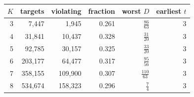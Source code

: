 \begin{table}[htbp]
\medskip

\begin{tabular}{@{}rrrrrr@{}}
\toprule
$K$ & targets & violating & fraction & worst $D$ & earliest $t$ \\
\midrule
3 & 7,447 & 1,945 & 0.261 & $\frac{86}{63}$ & 3 \\
4 & 31,841 & 10,437 & 0.328 & $\frac{31}{20}$ & 3 \\
5 & 92,785 & 30,157 & 0.325 & $\frac{33}{20}$ & 3 \\
6 & 203,177 & 64,477 & 0.317 & $\frac{95}{56}$ & 3 \\
7 & 358,155 & 109,900 & 0.307 & $\frac{110}{63}$ & 3 \\
8 & 534,674 & 158,323 & 0.296 & $\frac{7}{4}$ & 3 \\
\bottomrule
\end{tabular}
\end{table}
